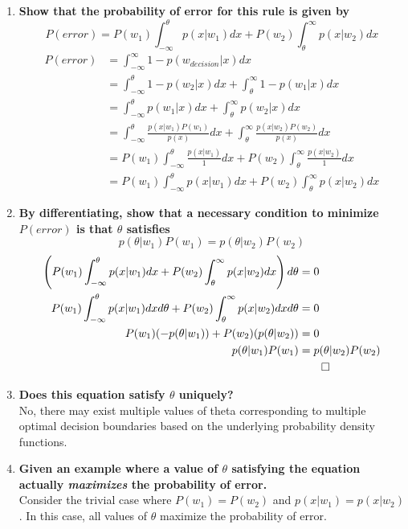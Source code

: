 \documentclass[12pt]{article}
\begin{document}
\begin{enumerate}
  \begin{enumerate}
  \item \textbf{Show that the probability of error for this rule is given by}
    \begin{equation}
      P(error) = P(w_1)\int_{-\infty}^\theta p(x|w_1)dx + P(w_2) \int_\theta^\infty p(x|w_2)dx
    \end{equation}
    \begin{equation}
    \begin{split}
      P(error)& = \int_{-\infty}^\infty 1-p(w_{decision}|x)dx \\
      & = \int_{-\infty}^\theta 1-p(w_2|x)dx + \int_\theta^\infty 1-p(w_1|x)dx \\
      & = \int_{-\infty}^\theta p(w_1|x)dx + \int_\theta^\infty p(w_2|x)dx \\
      & = \int_{-\infty}^\theta \frac{p(x|w_1)P(w_1)}{p(x)}dx + \int_\theta^\infty \frac{p(x|w_2)P(w_2)}{p(x)}dx \\
      & = P(w_1)\int_{-\infty}^\theta \frac{p(x|w_1)}{1}dx + P(w_2)\int_\theta^\infty \frac{p(x|w_2)}{1}dx \\
      & \boxed{= P(w_1)\int_{-\infty}^\theta p(x|w_1)dx + P(w_2) \int_\theta^\infty p(x|w_2)dx}
    \end{split}
    \end{equation}
  \item \textbf{By differentiating, show that a necessary condition to minimize $P(error)$ is that $\theta$ satisfies}
    \begin{equation}
      p(\theta|w_1)P(w_1)=p(\theta|w_2)P(w_2)
    \end{equation}
    \begin{equation}
    \begin{split}
      \left(P(w_1)\int_{-\infty}^\theta p(x|w_1)dx + P(w_2) \int_\theta^\infty p(x|w_2)dx\right) d\theta& = 0 \\
      P(w_1)\int_{-\infty}^\theta p(x|w_1)dxd\theta + P(w_2) \int_\theta^\infty p(x|w_2)dxd\theta& = 0 \\
      P(w_1)(-p(\theta|w_1)) + P(w_2)(p(\theta|w_2))& = 0 \\
      p(\theta|w_1)P(w_1)& =p(\theta|w_2)P(w_2) \\
      & \qed
    \end{split}
    \end{equation}
  \item \textbf{Does this equation satisfy $\theta$ uniquely?} \\
    No, there may exist multiple values of theta corresponding to multiple optimal decision boundaries based on the underlying probability density functions.
  \item \textbf{Given an example where a value of $\theta$ satisfying the equation actually \emph{maximizes} the probability of error.} \\
    Consider the trivial case where $P(w_1)=P(w_2)$ and $p(x|w_1)=p(x|w_2)$. In this case, all values of $\theta$ maximize the probability of error.
  \end{enumerate}
\end{enumerate}
 
\end{document}
